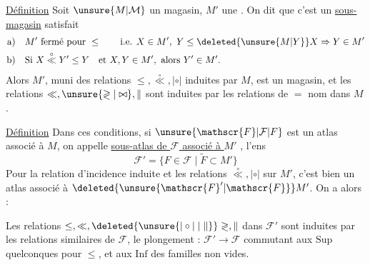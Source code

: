 \uline{Définition} Soit $\unsure{M|\mathcal{M}}$ un magasin, $M'$ une . On dit que c'est un \uline{sous-magasin}  satisfait
\[
\begin{aligned}
\text{a)}\quad&M'\ \text{fermé pour }\leq\qquad\text{i.e. }X\in M',\ Y\leq\deleted{\unsure{M|Y}}X\Rightarrow Y\in M'\\
\text{b)}\quad&\text{Si }X\overset{\circ}{\ll}Y'\leq Y\quad\text{et }X,Y\in M',\ \text{alors }Y'\in M'.
\end{aligned}
\]
Alors $M'$, muni des relations $\leq,\overset{\circ}{\ll},\mathrel{|\circ|}$ induites par $M$, est un magasin, et les relations $\ll,\unsure{\gtrless|\bowtie},\parallel$  sont induites par les relations de $=$ nom dans $M$.

\uline{Définition} Dans ces conditions, si $\unsure{\mathscr{F}|\mathcal{F}|F}$ est un atlas associé à $M$, on appelle \uline{sous-atlas de $\mathscr{F}$ associé à $M'$} , l'ens  
\[
\mathscr{F}'=\{F\in\mathscr{F}\mid\widetilde{F}\subset M'\}
\]
Pour la relation d'incidence induite  et les relations $\overset{\circ}{\ll},\mathrel{|\circ|}$ sur $M'$, c'est bien un atlas associé à $\deleted{\unsure{\mathscr{F}'|\mathscr{F}}}M'$. On a alors :

Les relations $\leq,\ll,\deleted{\unsure{\mathrel{|\circ|}|\parallel}}\gtrless,\parallel$ dans $\mathscr{F}'$ sont induites par les relations similaires de $\mathscr{F}$, le plongement : $\mathscr{F}'\longrightarrow\mathscr{F}$ commutant aux $\mathrm{Sup}$ quelconques pour $\leq$, et aux $\mathrm{Inf}$ des familles non vides.
